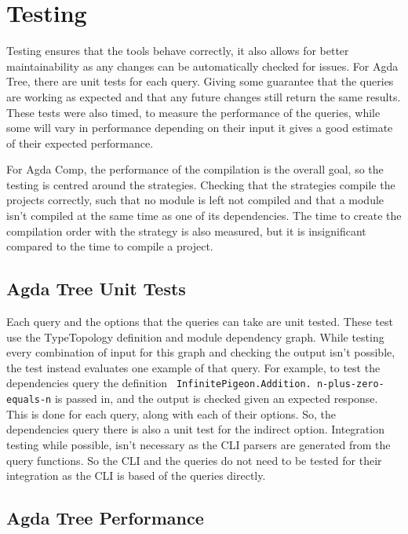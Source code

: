 
\chapter{Testing}

Testing ensures that the tools behave correctly, it also allows for better
maintainability as any changes can be automatically checked for issues. For
Agda Tree, there are unit tests for each query. Giving some guarantee that the
queries are working as expected and that any future changes still return the
same results. These tests were also timed, to measure the performance of the
queries, while some will vary in performance depending on their input it gives
a good estimate of their expected performance.

For Agda Comp, the performance of the compilation is the overall goal, so the
testing is centred around the strategies. Checking that the strategies compile
the projects correctly, such that no module is left not compiled and that a
module isn't compiled at the same time as one of its dependencies. The time to
create the compilation order with the strategy is also measured, but it is
insignificant compared to the time to compile a project.

\section{Agda Tree Unit Tests}

Each query and the options that the queries can take are unit tested. These
test use the TypeTopology definition and module dependency graph. While testing
every combination of input for this graph and checking the output isn't
possible, the test instead evaluates one example of that query. For example, to
test the dependencies query the definition \texttt{ InfinitePigeon.Addition.
n-plus-zero-equals-n} is passed in, and the output is
checked given an expected response. This is done for each query, along with
each of their options. So, the dependencies query there is also a unit test
for the indirect option. Integration testing while possible, isn't necessary as
the CLI parsers are generated from the query functions. So the CLI and the
queries do not need to be tested for their integration as the CLI is based of
the queries directly. 

\section{Agda Tree Performance} \label{sub:agda tree performance}

